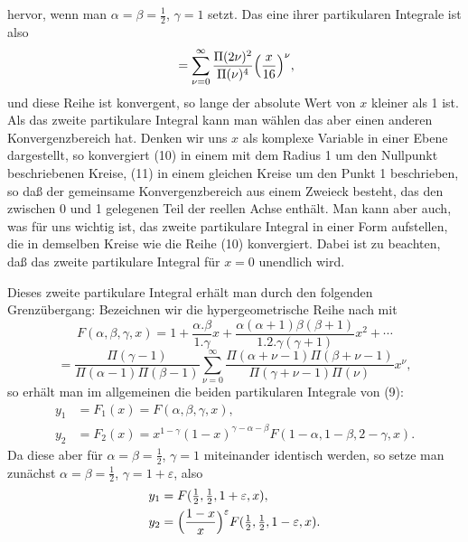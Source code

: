
hervor, wenn man $\alpha=\beta=\frac12$, $\gamma=1$ setzt. Das eine ihrer
partikularen Integrale ist also
\[
{}= \sum_{\nu=0}^{\infty} \frac{\Pi(2\nu)^2}{\Pi(\nu)^4}\Bigl(\frac{x}{16}\Bigr)^\nu,
\]
und diese Reihe ist konvergent, so lange der absolute Wert von
$x$ kleiner als 1 ist. Als das zweite partikulare Integral kann man
wählen
das aber einen anderen Konvergenzbereich hat. Denken wir uns
$x$ als komplexe Variable in einer Ebene dargestellt, so konvergiert
(10) in einem mit dem Radius 1 um den Nullpunkt beschriebenen
Kreise, (11) in einem gleichen Kreise um den Punkt 1 beschrieben,
so daß der gemeinsame Konvergenzbereich aus einem Zweieck
besteht, das den zwischen 0 und 1 gelegenen Teil der reellen
Achse enthält. Man kann aber auch, was für uns wichtig ist,
das zweite partikulare Integral in einer Form aufstellen, die in
demselben Kreise wie die Reihe (10) konvergiert. Dabei ist zu
beachten, daß das zweite partikulare Integral für $x=0$ unendlich
wird.

Dieses zweite partikulare Integral erhält man durch den
folgenden Grenzübergang: Bezeichnen wir die hypergeometrische
Reihe nach  mit
\[
F(\alpha,\beta,\gamma,x) = 1 + \frac{\alpha.\beta}{1.\gamma}x + \frac{\alpha(\alpha+1)\beta(\beta+1)}{1.2.\gamma(\gamma+1)}x^2 + \cdots
\]
\[
{}= \frac{\Pi(\gamma-1)}{\Pi(\alpha-1)\Pi(\beta-1)} \sum_{\nu=0}^{\infty} \frac{\Pi(\alpha+\nu-1)\Pi(\beta+\nu-1)}{\Pi(\gamma+\nu-1)\Pi(\nu)} x^\nu,
\]
so erhält man im allgemeinen die beiden partikularen Integrale
von (9):
\[
\begin{aligned}
y_1 &= F_1(x) = F(\alpha,\beta,\gamma,x), \\
y_2 &= F_2(x) = x^{1-\gamma}(1-x)^{\gamma-\alpha-\beta} F(1-\alpha,1-\beta,2-\gamma,x).
\end{aligned}
\]
Da diese aber für $\alpha=\beta=\frac12$, $\gamma=1$ miteinander identisch
werden, so setze man zunächst $\alpha=\beta=\frac12$, $\gamma=1+\varepsilon$, also
\[
\begin{aligned}
y_1 &= F(\tfrac12,\tfrac12,1+\varepsilon,x), \\
y_2 &= \Bigl(\frac{1-x}{x}\Bigr)^\varepsilon F(\tfrac12,\tfrac12,1-\varepsilon,x).
\end{aligned}
\]
